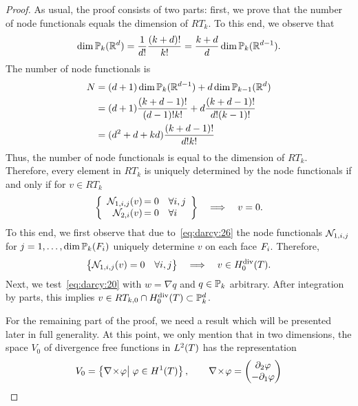 \begin{proof}
  As usual, the proof consists of two parts: first, we prove that the
  number of node functionals equals the dimension of $RT_k$. To this
  end, we observe that
  \begin{gather}
    \label{eq:darcy:32}
    \dim \P_k(\R^d) = \frac1{d!} \frac{(k+d)!}{k!}
    = \frac{k+d}d \dim \P_k(\R^{d-1}).
  \end{gather}
  The number of node functionals is
  \begin{align*}
    N &= (d+1) \dim \P_k(\R^{d-1}) + d \dim \P_{k-1}(\R^d)
    \\
    &= (d+1)\frac{(k+d-1)!}{(d-1)!k!}
      + d\frac{(k+d-1)!}{d! (k-1)!}\\
    &= (d^2+d+k d)\frac{(k+d-1)!}{d!k!}
  \end{align*}
  Thus, the number of node functionals is equal to the dimension of
  $RT_k$. Therefore, every element in $RT_k$ is uniquely determined
  by the node functionals if and only if for $v\in RT_k$
  \begin{gather*}
    \left\{
      \begin{array}{r@{\,}ll}
        \nodal_{1,i,j}(v) &=0 &\forall i,j
        \\
        \nodal_{2,i}(v) &=0 &\forall i
      \end{array}
      \right\}
      \quad\Longrightarrow\quad
      v=0.
  \end{gather*}
  To this end, we first observe that due to~\eqref{eq:darcy:26} the
  node functionals $\nodal_{1,i,j}$ for $j=1,\dots,\dim \P_k(\face_i)$
 uniquely determine $v$ on each face $\face_i$. Therefore,
 \begin{gather*}
   \bigl\{\nodal_{1,i,j}(v) =0 \quad\forall i,j\bigr\}
   \quad\Longrightarrow\quad
   v\in \Hdiv_0(\cell).
 \end{gather*}
 Next, we test~\eqref{eq:darcy:20} with $w=\nabla q$ and $q\in
 \P_k$ arbitrary. After integration by parts, this implies $v\in
 RT_{k,0} \cap \Hdiv_0(\cell) \subset \P_k^d$.

 For the remaining part of the proof, we need a result which will be
 presented later in full generality. At this point, we only mention
 that in two dimensions, the space $V_0$ of divergence free functions
 in $L^2(\cell)$ has the representation
 \begin{gather}
   \label{eq:darcy:34}
   V_0 = \left\{ \vcurl \phi
     \big\vert \; \phi\in H^1(\cell) \right\},
   \qquad
   \vcurl \phi = \begin{pmatrix}
     \d_2 \phi \\ -\d_1 \phi
   \end{pmatrix}
 \end{gather}


\end{proof}
